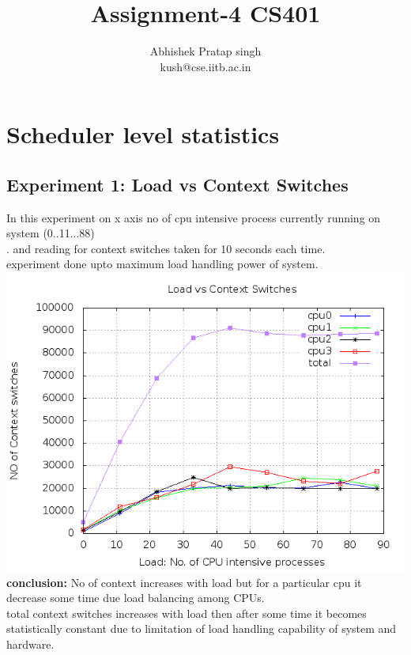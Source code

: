 \documentclass[a4paper,11pt]{report}
\title{{\bf Assignment-4 CS401} }
\author{Abhishek Pratap singh\\
kush@cse.iitb.ac.in}
\begin{document}
\maketitle
\tableofcontents
 \section{Scheduler level statistics}
 \subsection{Experiment 1: Load vs Context Switches}
  In this experiment on x axis no of cpu intensive process currently running on system (0..11...88)\\ .
  and reading for context switches taken for 10 seconds each time.\\
  experiment done upto maximum load handling power of system.\\
  \includegraphics[scale=0.5]{loadvscs.png}
  \\{\bf conclusion:} No of context increases with load but for a particular cpu it decrease some time due load balancing among CPUs.\\
   total context switches increases with load then after some time it becomes statistically constant due to limitation of load handling capability of system and hardware.
\end{document}
